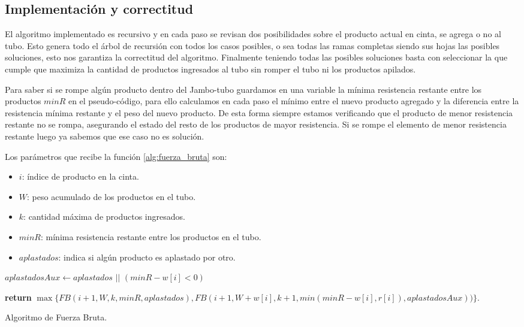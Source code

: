 \documentclass[10pt,a4paper]{article}
\begin{document}
\subsection{Implementación y correctitud}
El algoritmo implementado es recursivo y en cada paso se revisan dos posibilidades sobre el producto actual en cinta, se agrega o no al tubo. Esto genera todo el árbol de recursión con todos los casos posibles, o sea todas las ramas completas siendo sus hojas las posibles soluciones, esto nos garantiza la correctitud del algoritmo. Finalmente teniendo todas las posibles soluciones basta con seleccionar la que cumple que maximiza la cantidad de productos ingresados al tubo sin romper el tubo ni los productos apilados.

Para saber si se rompe algún producto dentro del Jambo-tubo guardamos en una variable la mínima resistencia restante entre los productos $minR$ en el pseudo-código, para ello calculamos en cada paso el mínimo entre el nuevo producto agregado y la diferencia entre la resistencia mínima restante y el peso del nuevo producto. De esta forma siempre estamos verificando que el producto de menor resistencia restante no se rompa, asegurando el estado del resto de los productos de mayor resistencia. Si se rompe el elemento de menor resistencia restante luego ya sabemos que ese caso no es solución.

Los parámetros que recibe la función \ref{alg:fuerza_bruta} son:
\begin{itemize}
	\item $i$: índice de producto en la cinta.
	\item $W$: peso acumulado de los productos en el tubo.
	\item $k$: cantidad máxima de productos ingresados.
	\item $minR$: mínima resistencia restante entre los productos en el tubo.
	\item $aplastados$: indica si algún producto es aplastado por otro.
\end{itemize}

\begin{algorithm}
	\begin{algorithmic}[1]

		\EndIf
		
		\State $aplastadosAux \leftarrow aplastados$ $||$ $(minR - w[i] < 0)$ 
		
		\State \textbf{return} $\max \{ FB(i+1, W, k, minR, aplastados), FB(i+1, W+w[i], k+1, min(minR - w[i], r[i]), aplastadosAux)) \}$.

		\EndFunction
	\end{algorithmic}
	\caption{Algoritmo de Fuerza Bruta.}
	\label{alg:fuerza_bruta}
\end{algorithm} 	
\end{document}
